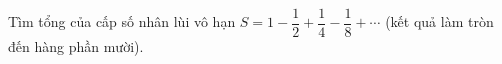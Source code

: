 \begin{ex}
Tìm tổng của cấp số nhân lùi vô hạn $S=1-\dfrac12+\dfrac14-\dfrac18+\cdots$ (kết quả làm tròn đến hàng phần mười).
\end{ex}
